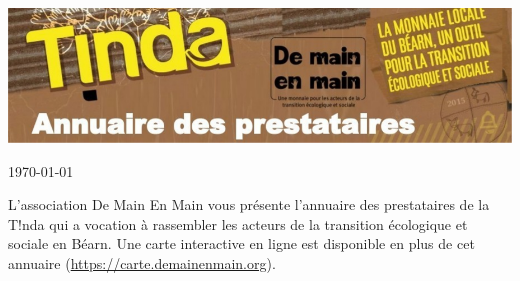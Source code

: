
  \begin{center}
    \includegraphics[width=\linewidth]{bandeau_tinda.png}
  \end{center}
\today

    \vspace{.5cm}
    \noindent L’association De Main En Main vous présente l’annuaire des prestataires de la T!nda qui a
vocation à rassembler les acteurs de la transition écologique et sociale en Béarn. Une carte interactive en ligne
    est disponible en plus de cet annuaire (\url{https://carte.demainenmain.org}).
    \vspace{.5cm}

